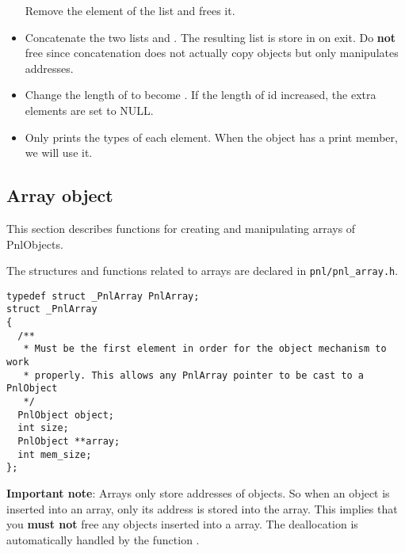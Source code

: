 \begin{itemize}
  \sshortdescribe Remove the  element of the list  and frees it.
\item {}
  \sshortdescribe Concatenate the two lists  and . The
  resulting list is store in  on exit. Do {\bf not} free 
  since concatenation does not actually copy objects but only manipulates
  addresses.
\item {}
  \sshortdescribe Change the length of  to become . If the length
  of  id increased, the extra elements are set to NULL.
\item {}
  \sshortdescribe Only prints the types of each element. When  the
  \PnlObject object has a print member, we will use it.
\end{itemize}

\subsection{Array object}

This section describes functions for creating and manipulating arrays of
PnlObjects.

The structures and functions related to arrays are declared in
\verb!pnl/pnl_array.h!.

\begin{lstlisting}
typedef struct _PnlArray PnlArray;
struct _PnlArray
{
  /**
   * Must be the first element in order for the object mechanism to work
   * properly. This allows any PnlArray pointer to be cast to a PnlObject
   */
  PnlObject object; 
  int size;
  PnlObject **array;
  int mem_size;
};
\end{lstlisting}

\textbf{Important note}: Arrays only store addresses of objects. So when an
object is inserted into an array, only its address is stored into the array. This
implies that you \textbf{must not} free any objects inserted into a array. The
deallocation is automatically handled by the function .

